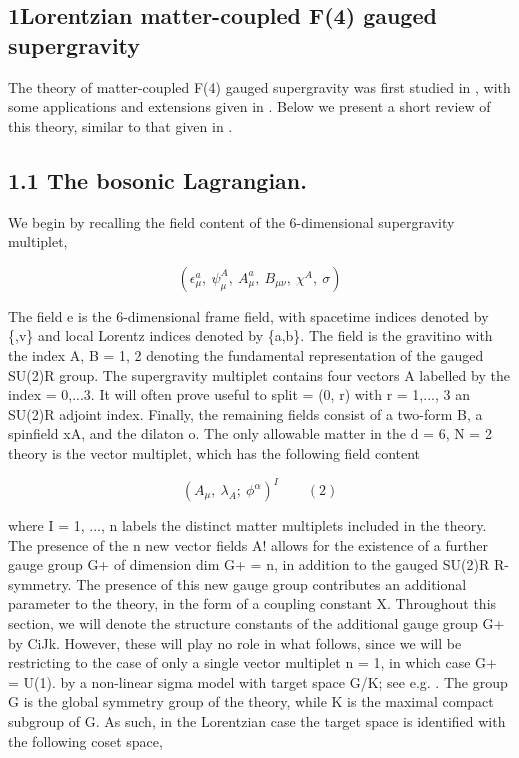 \documentclass{article}
\begin{document}
\sloppy

\subsection*{1Lorentzian matter-coupled F(4) gauged supergravity}


The theory of matter-coupled F(4) gauged supergravity was first studied in , with some
applications and extensions given in . Below we present a short review of this theory, similar
to that given in .


\subsection*{1.1 The bosonic Lagrangian.}


We begin by recalling the field content of the 6-dimensional supergravity multiplet,


\begin{equation}
( \epsilon _ { \mu } ^ { a }, ~ \psi _ { \mu } ^ { A }, ~ A _ { \mu } ^ { a }, ~ B _ { \mu \nu }, ~ \chi ^ { A }, ~ \sigma )
\end{equation}


The field e is the 6-dimensional frame field, with spacetime indices denoted by \{,v\}
and local Lorentz indices denoted by \{a,b\}. The field  is the gravitino with the index
A, B = 1, 2 denoting the fundamental representation of the gauged SU(2)R group. The
supergravity multiplet contains four vectors A labelled by the index  = 0,...3. It will
often prove useful to split  = (0, r) with r = 1,..., 3 an SU(2)R adjoint index. Finally, the
remaining fields consist of a two-form B, a spinfield xA, and the dilaton o. The only
allowable matter in the d = 6, N = 2 theory is the vector multiplet, which has the following
field content


\begin{equation}
( A _ { \mu }, ~ \lambda _ { A } ; ~ \phi ^ { \alpha } ) ^ { I } \qquad ( 2 )
\end{equation}


where I = 1, ..., n labels the distinct matter multiplets included in the theory. The presence
of the n new vector fields A! allows for the existence of a further gauge group G+ of dimension
dim G+ = n, in addition to the gauged SU(2)R R-symmetry. The presence of this new gauge
group contributes an additional parameter to the theory, in the form of a coupling constant
X. Throughout this section, we will denote the structure constants of the additional gauge
group G+ by CiJk. However, these will play no role in what follows, since we will be
restricting to the case of only a single vector multiplet n = 1, in which case G+ = U(1).
by a non-linear sigma model with target space G/K; see e.g. . The group G is the global
symmetry group of the theory, while K is the maximal compact subgroup of G. As such, in
the Lorentzian case the target space is identified with the following coset space,
\end{document}
